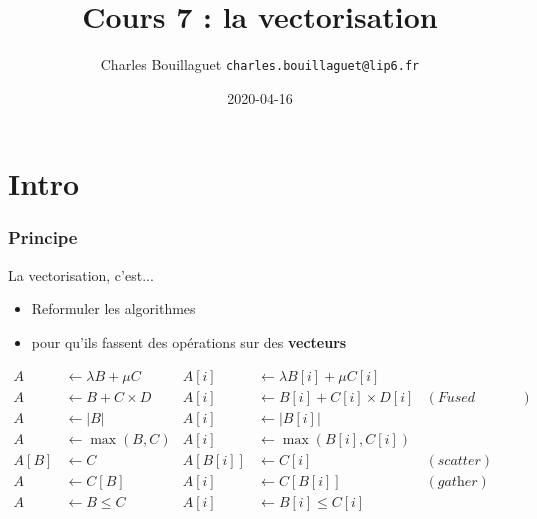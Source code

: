 \documentclass[xcolor={x11names,svgnames}]{beamer}
\author[C.~Bouillaguet]{Charles Bouillaguet \newline
  {\small \texttt{charles.bouillaguet@lip6.fr}}}
\title{Cours 7 : la \og vectorisation\fg}
\date{2020-04-16}
\begin{document}
\frame{\titlepage}

\section{Intro}

\begin{frame}
  \frametitle{Principe}

  \begin{block}{La vectorisation, c'est...}
    \begin{itemize}
    \item Reformuler les algorithmes
    \item pour qu'ils fassent des opérations sur des \textbf{vecteurs}
    \end{itemize}
     
  \end{block}

  \begin{align*}
    A &\gets \lambda B + \mu C & A[i] &\gets \lambda B[i] + \mu C[i]\\
    A &\gets B + C \times D    & A[i] &\gets B[i] + C[i] \times D[i] & (\textit{Fused Multiply-Add}) \\
    A &\gets |B|               & A[i] &\gets |B[i]|  \\
    A &\gets \max(B, C)        & A[i] &\gets \max(B[i], C[i])  \\
    A[B] &\gets C              & A[B[i]] &\gets C[i] & (\textit{scatter}) \\
    A &\gets C[B]              & A[i] &\gets C[B[i]] & (\textit{gather}) \\
    A &\gets B \leq C          & A[i] &\gets B[i] \leq C[i]  \\
  \end{align*}

\end{frame}

\end{document}
